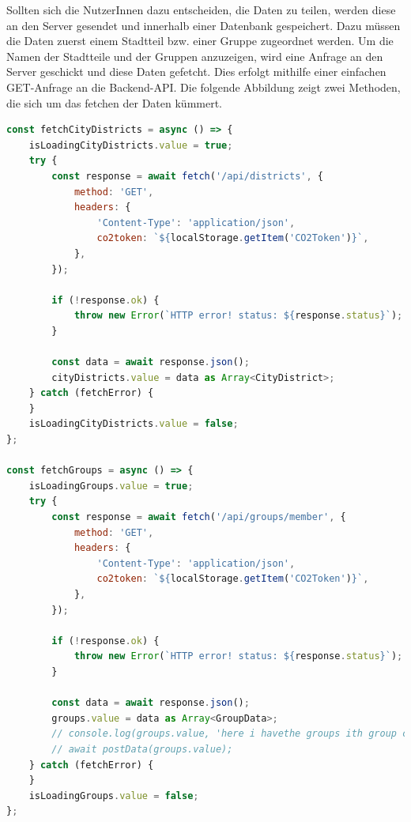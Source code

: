 Sollten sich die NutzerInnen dazu entscheiden, die Daten zu teilen, werden diese an den Server gesendet und innerhalb einer Datenbank gespeichert.
Dazu müssen die Daten zuerst einem Stadtteil bzw. einer Gruppe zugeordnet werden.
Um die Namen der Stadtteile und der Gruppen anzuzeigen, wird eine Anfrage an den Server geschickt und diese Daten gefetcht.
Dies erfolgt mithilfe einer einfachen GET-Anfrage an die Backend-API.
Die folgende Abbildung zeigt zwei Methoden, die sich um das fetchen der Daten kümmert.

\begin{lstlisting}[language={JavaScript}, caption={Laden der Stadtteile und Gruppen aus dem Backend}, label={lst:daten-aus-backend}]
    const fetchCityDistricts = async () => {
    isLoadingCityDistricts.value = true;
    try {
        const response = await fetch('/api/districts', {
            method: 'GET',
            headers: {
                'Content-Type': 'application/json',
                co2token: `${localStorage.getItem('CO2Token')}`,
            },
        });

        if (!response.ok) {
            throw new Error(`HTTP error! status: ${response.status}`);
        }

        const data = await response.json();
        cityDistricts.value = data as Array<CityDistrict>;
    } catch (fetchError) {
    }
    isLoadingCityDistricts.value = false;
};

const fetchGroups = async () => {
    isLoadingGroups.value = true;
    try {
        const response = await fetch('/api/groups/member', {
            method: 'GET',
            headers: {
                'Content-Type': 'application/json',
                co2token: `${localStorage.getItem('CO2Token')}`,
            },
        });

        if (!response.ok) {
            throw new Error(`HTTP error! status: ${response.status}`);
        }

        const data = await response.json();
        groups.value = data as Array<GroupData>;
        // console.log(groups.value, 'here i havethe groups ith group codes');
        // await postData(groups.value);
    } catch (fetchError) {
    }
    isLoadingGroups.value = false;
};
\end{lstlisting}


